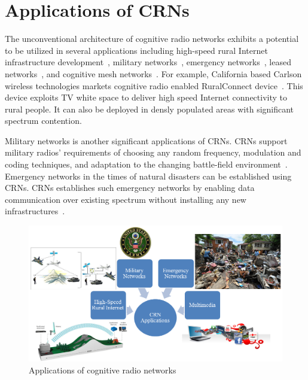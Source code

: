\section{Applications of CRNs}
The unconventional architecture of cognitive radio networks exhibits a potential to be utilized in several applications including high-speed rural Internet infrastructure development~\cite{fitch2011wireless}, military networks~\cite{murty2003software}, emergency networks~\cite{maldonado2005cognitive}, leased networks~\cite{stine2005spectrum}, and cognitive mesh networks~\cite{berlemann2005policy}. For example, California based Carlson wireless technologies markets cognitive radio enabled RuralConnect device~\cite{ruralConnect}. This device exploits TV white space to deliver high speed Internet connectivity to rural people. It can also be deployed in densly populated areas with significant spectrum contention.

Military networks is another significant applications of CRNs. CRNs support military radios' requirements of choosing any random frequency, modulation and coding techniques, and adaptation to the changing battle-field environment~\cite{akyildiz2006next}. Emergency networks in the times of natural disasters can be established using CRNs. CRNs establishes such emergency networks by enabling data communication over existing spectrum without installing any new infrastructures~\cite{maldonado2005cognitive}.

\begin{figure}[!htbp]
    \begin{center}
        \includegraphics[width=1.0\textwidth]{myFigures/CRNApplications.png}
        \caption{Applications of cognitive radio networks}
        \label{fig:CRNApplications}
    \end{center}
\end{figure}

